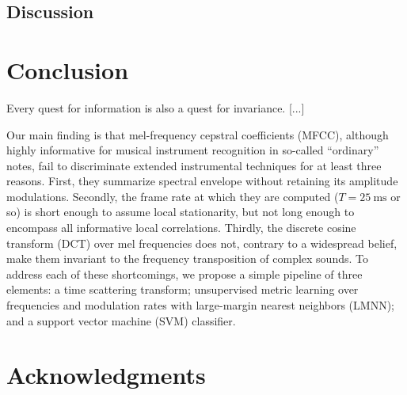 \documentclass{article}
\begin{document}
\subsection{Discussion}


\section{Conclusion}
Every quest for information is also a quest for invariance. [...]

Our main finding is that mel-frequency cepstral coefficients (MFCC), although highly informative for musical instrument recognition in so-called ``ordinary'' notes, fail to discriminate extended instrumental techniques for at least three reasons.
First, they summarize spectral envelope without retaining its amplitude modulations.
Secondly, the frame rate at which they are computed ($T=\SI{25}{\milli\second}$ or so) is short enough to assume local stationarity, but not long enough to encompass all informative local correlations.
Thirdly, the discrete cosine transform (DCT) over mel frequencies does not, contrary to a widespread belief, make them invariant to the frequency transposition of complex sounds.
To address each of these shortcomings, we propose a simple pipeline of three elements: a time scattering transform; unsupervised metric learning over frequencies and modulation rates with large-margin nearest neighbors (LMNN); and a support vector machine (SVM) classifier.


\section{Acknowledgments}




\end{document}
